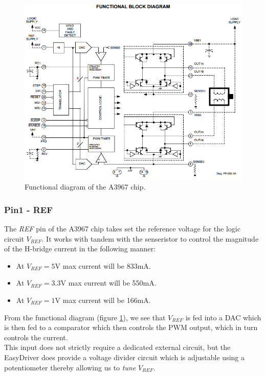 \documentclass{article}
\theoremstyle{plain}
\theoremstyle{definition}
\theoremstyle{remark}
\begin{document}
\begin{figure}[htb]
\begin{center}
\includegraphics[width = 14cm]{A3967_functionalDiagram.png}
\caption{Functional diagram of the A3967 chip.}
\label{q1_b2}
\end{center}
\end{figure}

\subsubsection*{Pin1 - REF}
The \emph{REF} pin of the A3967 chip takes set the reference voltage for the logic circuit $V_{REF}$. It works with tandem with the senseristor to control the magnitude of the H-bridge current in the following manner:
\begin{itemize}
\item At $V_{REF} = 5$V max current will be 833mA.
\item At $V_{REF} = 3.3$V max current will be 550mA.
\item At $V_{REF} = 1$V max current will be 166mA.
\end{itemize}

From the functional diagram (figure \ref{q1_b2}), we see that $V_{REF}$ is fed into a DAC which is then fed to a comparator which then controls the PWM output, which in turn controls the current.\\

This input does not strictly require a dedicated external circuit, but the EasyDriver does provide a voltage divider circuit which is adjustable using a potentiometer thereby allowing us to \emph{tune} $V_{REF}$. 
\end{document}
